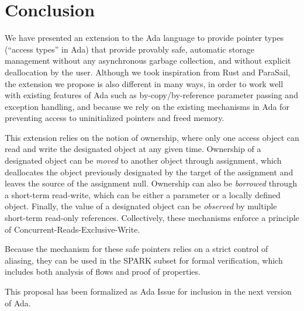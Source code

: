 \documentclass{llncs}
\begin{document}
\section{Conclusion}
We have presented an extension to the Ada language to provide pointer types (``access types'' in Ada) that provide provably safe, automatic
storage management without any asynchronous garbage collection, and without explicit deallocation by the user. Although we took inspiration
from Rust and ParaSail, the extension we propose is also different in many ways, in order to work well with existing features of Ada such
as by-copy/by-reference parameter passing and exception handling, and because we rely on the existing mechanisms in Ada for preventing access
to uninitialized pointers and freed memory. 

\smallskip
This extension relies on the notion of ownership, where only one access object can read and write the designated object at any given time.
Ownership of a designated object can be \textit{moved} to another object through assignment, which deallocates the object previously designated
by the target of the assignment and leaves the source of the assignment null. Ownership can also be \textit{borrowed} through a short-term read-write,
which can be either a parameter or a locally defined object. Finally, the value of a designated object can be \textit{observed} by multiple short-term
read-only references. Collectively, these mechanisms enforce a principle of Concurrent-Reads-Exclusive-Write.

\smallskip
Because the mechanism for these safe pointers relies on a strict control of aliasing, they can be used in the SPARK subset for formal verification, which
includes both analysis of flows and proof of properties. 

\smallskip
This proposal has been formalized as Ada Issue \cite{AI2017} for inclusion in the next version of Ada.

\printbibliography[title={References}]
\end{document}
